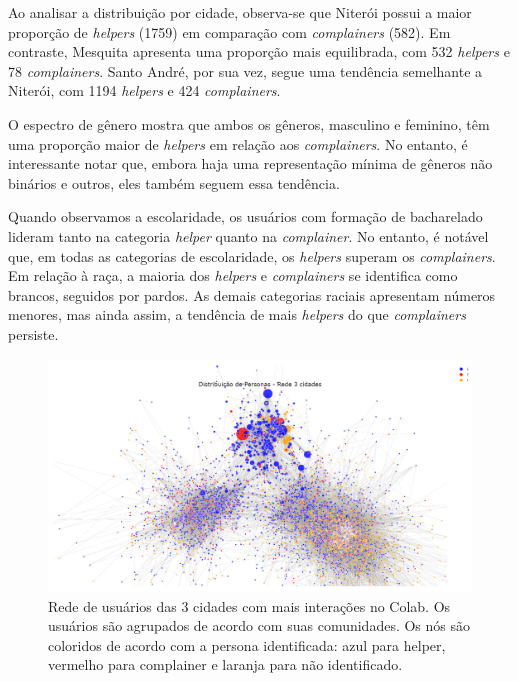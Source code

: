 Ao analisar a distribuição por cidade, observa-se que Niterói possui a maior proporção de \textit{helpers} (1759) em comparação com \textit{complainers} (582). Em contraste, Mesquita apresenta uma proporção mais equilibrada, com 532 \textit{helpers} e 78 \textit{complainers}. Santo André, por sua vez, segue uma tendência semelhante a Niterói, com 1194 \textit{helpers} e 424 \textit{complainers}. 

O espectro de gênero mostra que ambos os gêneros, masculino e feminino, têm uma proporção maior de \textit{helpers} em relação aos \textit{complainers}. No entanto, é interessante notar que, embora haja uma representação mínima de gêneros não binários e outros, eles também seguem essa tendência. 

Quando observamos a escolaridade, os usuários com formação de bacharelado lideram tanto na categoria \textit{helper} quanto na \textit{complainer}. No entanto, é notável que, em todas as categorias de escolaridade, os \textit{helpers} superam os \textit{complainers}. Em relação à raça, a maioria dos \textit{helpers} e \textit{complainers} se identifica como brancos, seguidos por pardos. As demais categorias raciais apresentam números menores, mas ainda assim, a tendência de mais \textit{helpers} do que \textit{complainers} persiste.

\begin{figure}[h]
    \centering
    \includegraphics[width=1\textwidth]{images/personas_network.png} 
    \caption{Rede de usuários das 3 cidades com mais interações no Colab. Os usuários são agrupados de acordo com suas comunidades. Os nós são coloridos de acordo com a persona identificada: azul para helper, vermelho para complainer e laranja para não identificado.}
    \label{fig:personas_network}
\end{figure}

